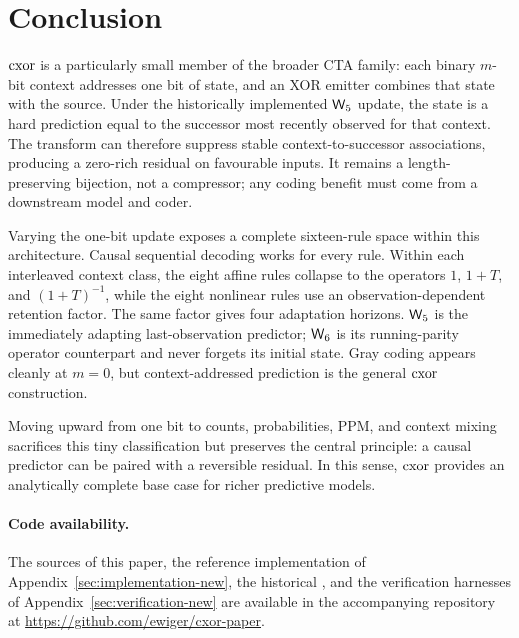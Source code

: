 \section{Conclusion}\label{sec:conclusion-new}

$\mathrm{cxor}$ is a particularly small member of the broader CTA family: each binary $m$-bit context
addresses one bit of state, and an XOR emitter combines that state with the source.  Under the
historically implemented $\mathsf{W}_{5}$ update, the state is a hard prediction equal to the successor most
recently observed for that context.  The transform can therefore suppress stable
context-to-successor associations, producing a zero-rich residual on favourable inputs.  It
remains a length-preserving bijection, not a compressor; any coding benefit must come from a
downstream model and coder.

Varying the one-bit update exposes a complete sixteen-rule space within this architecture.
Causal sequential decoding works for every rule.  Within each interleaved context class, the
eight affine rules collapse to the operators $1$, $1+T$, and $(1+T)^{-1}$, while the eight
nonlinear rules use an observation-dependent retention factor.  The same factor gives four
adaptation horizons.  $\mathsf{W}_{5}$ is the immediately adapting last-observation predictor; $\mathsf{W}_{6}$ is its
running-parity operator counterpart and never forgets its initial state.  Gray coding appears
cleanly at $m=0$, but context-addressed prediction is the general $\mathrm{cxor}$ construction.

Moving upward from one bit to counts, probabilities, PPM, and context mixing sacrifices this tiny
classification but preserves the central principle: a causal predictor can be paired with a
reversible residual.  In this sense, $\mathrm{cxor}$ provides an analytically complete base case for
richer predictive models.

\paragraph{Code availability.}
The sources of this paper, the reference implementation of
Appendix~\ref{sec:implementation-new}, the historical , and the verification
harnesses of Appendix~\ref{sec:verification-new} are available in the accompanying
repository~\cite{cxorrepo} at \url{https://github.com/ewiger/cxor-paper}.
